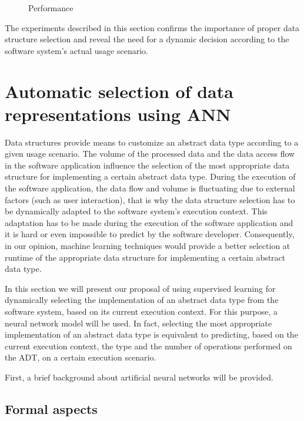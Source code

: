 \begin{figure}
\centerline{}
       \caption{Performance}
 \label{fig:perf1}
\end{figure}


The experiments described in this section confirms the importance of proper data structure selection and reveal the need for a dynamic decision according to the software system's actual usage scenario.


\section{Automatic selection of data representations using ANN}\label{our}

Data structures \cite{adt} provide means to customize an abstract data type according to a given usage scenario. The volume of the processed data and the data access flow in the software application influence the selection of the most appropriate data structure for implementing a certain abstract data type. During the execution of the software application, the data flow and volume is fluctuating due to external factors (such as user interaction), that is why the data structure selection has to be dynamically adapted to the software system's execution context. This adaptation has to be made during the execution of the software application and it is hard or even impossible to predict by the software developer. Consequently, in our opinion, machine learning techniques would provide a better selection at runtime of the appropriate data structure for implementing a certain abstract data type.

In this section we will present our proposal of using supervised learning for dynamically selecting the implementation of an abstract data type from the software system, based on its current execution context. For this purpose, a neural network model will be used. In fact, selecting the most appropriate implementation of an abstract data type is equivalent to predicting, based on the current execution
context, the type and the number of operations performed on the ADT, on a certain execution scenario.

First, a brief background about {artificial neural networks} will be provided.

\subsection{Formal aspects}\label{tm}

